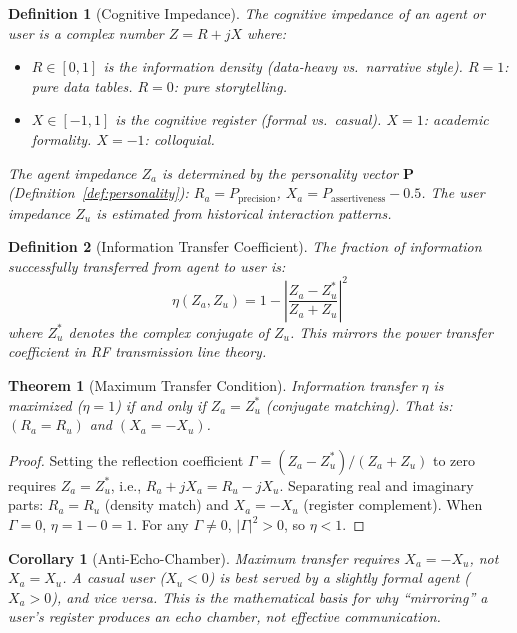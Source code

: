\documentclass[11pt,a4paper]{article}
\newtheorem{theorem}{Theorem}
\newtheorem{definition}{Definition}
\newtheorem{corollary}{Corollary}
\begin{document}
\begin{definition}[Cognitive Impedance]
\label{def:impedance}
The cognitive impedance of an agent or user is a complex number
$Z = R + jX$ where:
\begin{itemize}[nosep]
  \item $R \in [0,1]$ is the \emph{information density} (data-heavy vs.\
    narrative style). $R = 1$: pure data tables. $R = 0$: pure storytelling.
  \item $X \in [-1,1]$ is the \emph{cognitive register} (formal vs.\ casual).
    $X = 1$: academic formality. $X = -1$: colloquial.
\end{itemize}
The agent impedance $Z_a$ is determined by the personality vector $\mathbf{P}$
(Definition~\ref{def:personality}):
$R_a = P_{\text{precision}}$, $X_a = P_{\text{assertiveness}} - 0.5$.
The user impedance $Z_u$ is estimated from historical interaction patterns.
\end{definition}

\begin{definition}[Information Transfer Coefficient]
\label{def:transfer}
The fraction of information successfully transferred from agent to user is:
\begin{equation}
  \eta(Z_a, Z_u) = 1 - \left|\frac{Z_a - Z_u^*}{Z_a + Z_u}\right|^2
  \label{eq:transfer}
\end{equation}
where $Z_u^*$ denotes the complex conjugate of $Z_u$.
This mirrors the power transfer coefficient in RF transmission line theory.
\end{definition}

\begin{theorem}[Maximum Transfer Condition]
\label{thm:impedance}
Information transfer $\eta$ is maximized ($\eta = 1$) if and only if
$Z_a = Z_u^*$ (conjugate matching). That is:
$(R_a = R_u)$ and $(X_a = -X_u)$.
\end{theorem}

\begin{proof}
Setting the reflection coefficient $\Gamma = (Z_a - Z_u^*)/(Z_a + Z_u)$
to zero requires $Z_a = Z_u^*$, i.e., $R_a + jX_a = R_u - jX_u$.
Separating real and imaginary parts: $R_a = R_u$ (density match) and
$X_a = -X_u$ (register complement). When $\Gamma = 0$, $\eta = 1 - 0 = 1$.
For any $\Gamma \neq 0$, $|\Gamma|^2 > 0$, so $\eta < 1$.
\end{proof}

\begin{corollary}[Anti-Echo-Chamber]
\label{cor:echo}
Maximum transfer requires $X_a = -X_u$, not $X_a = X_u$.
A casual user ($X_u < 0$) is best served by a slightly formal agent
($X_a > 0$), and vice versa. This is the mathematical basis for
why ``mirroring'' a user's register produces an echo chamber, not
effective communication.
\end{corollary}
\end{document}
